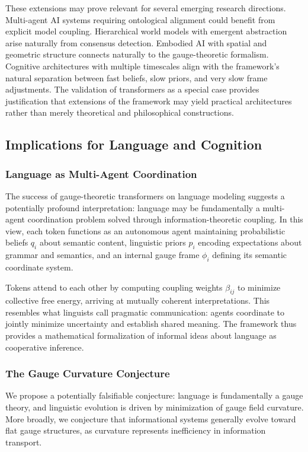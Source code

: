 \documentclass[11pt]{article}
\begin{document}
These extensions may prove relevant for several emerging research directions. Multi-agent AI systems requiring ontological alignment could benefit from explicit model coupling. Hierarchical world models with emergent abstraction arise naturally from consensus detection. Embodied AI with spatial and geometric structure connects naturally to the gauge-theoretic formalism. Cognitive architectures with multiple timescales align with the framework's natural separation between fast beliefs, slow priors, and very slow frame adjustments. The validation of transformers as a special case provides justification that extensions of the framework may yield practical architectures rather than merely theoretical and philosophical constructions.


\subsection{Implications for Language and Cognition}

\subsubsection{Language as Multi-Agent Coordination}

The success of gauge-theoretic transformers on language modeling suggests a potentially profound interpretation: language may be fundamentally a multi-agent coordination problem solved through information-theoretic coupling. In this view, each token functions as an autonomous agent maintaining probabilistic beliefs $q_i$ about semantic content, linguistic priors $p_i$ encoding expectations about grammar and semantics, and an internal gauge frame $\phi_i$ defining its semantic coordinate system.

Tokens attend to each other by computing coupling weights $\beta_{ij}$ to minimize collective free energy, arriving at mutually coherent interpretations. This resembles what linguists call pragmatic communication: agents coordinate to jointly minimize uncertainty and establish shared meaning. The framework thus provides a mathematical formalization of informal ideas about language as cooperative inference.

\subsubsection{The Gauge Curvature Conjecture}

We propose a potentially falsifiable conjecture: language is fundamentally a gauge theory, and linguistic evolution is driven by minimization of gauge field curvature. More broadly, we conjecture that informational systems generally evolve toward flat gauge structures, as curvature represents inefficiency in information transport.
\end{document}
